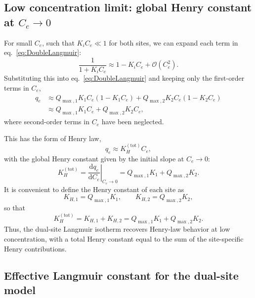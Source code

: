 \documentclass[12pt]{article}
\begin{document}
	\subsection{Low concentration limit: global Henry constant at \(C_e \to 0\)}
	
	For small \(C_e\), such that \(K_i C_e \ll 1\) for both sites,
	we can expand each term in eq.~\eqref{eq:DoubleLangmuir}:
	\begin{equation}
		\frac{1}{1 + K_i C_e}
		\approx 1 - K_i C_e + \mathcal{O}(C_e^2).
	\end{equation}
	Substituting this into eq.~\eqref{eq:DoubleLangmuir} and keeping only
	the first-order terms in \(C_e\),
	\begin{align}
		q_e
		&\approx Q_{\max,1} K_1 C_e (1 - K_1 C_e)
		+ Q_{\max,2} K_2 C_e (1 - K_2 C_e) \\
		&\approx Q_{\max,1} K_1 C_e + Q_{\max,2} K_2 C_e,
	\end{align}
	where second-order terms in \(C_e\) have been neglected.
	
	This has the form of Henry law,
	\begin{equation}
		q_e \approx K_H^{\mathrm{(tot)}} C_e,
	\end{equation}
	with the global Henry constant given by the initial slope at
	\(C_e \to 0\):
	\begin{equation}
		K_H^{\mathrm{(tot)}}
		= \left.\frac{\mathrm{d} q_e}{\mathrm{d} C_e}\right|_{C_e \to 0}
		= Q_{\max,1} K_1 + Q_{\max,2} K_2.
	\end{equation}
	It is convenient to define the Henry constant of each site as
	\begin{equation}
		K_{H,1} = Q_{\max,1} K_1,
		\qquad
		K_{H,2} = Q_{\max,2} K_2,
	\end{equation}
	so that
	\begin{equation}
		\boxed{K_H^{\mathrm{(tot)}} = K_{H,1} + K_{H,2}
			= Q_{\max,1} K_1 + Q_{\max,2} K_2.}
	\end{equation}
	Thus, the dual-site Langmuir isotherm recovers Henry-law behavior at
	low concentration, with a total Henry constant equal to the sum of
	the site-specific Henry contributions.
	
	\subsection{Effective Langmuir constant for the dual-site model}
	
\end{document}
